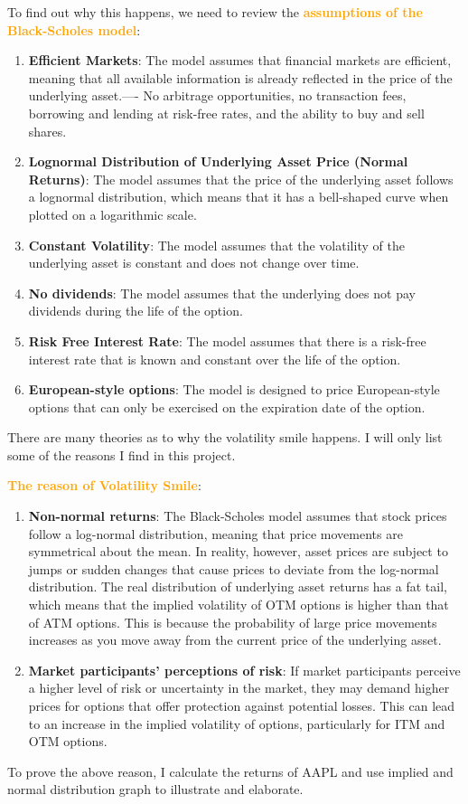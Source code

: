 \documentclass[11pt,en]{elegantpaper}
\begin{document}
To find out why this happens, we need to review the \textcolor{orange}{\textbf{assumptions of the Black-Scholes model}}:
\begin{enumerate}
    \item \textbf{Efficient Markets}: The model assumes that financial markets are efficient, meaning that all available information is already reflected in the price of the underlying asset.---- No arbitrage opportunities, no transaction fees, borrowing and lending at risk-free rates, and the ability to buy and sell shares.
    \item \textbf{Lognormal Distribution of Underlying Asset Price (Normal Returns)}: The model assumes that the price of the underlying asset follows a lognormal distribution, which means that it has a bell-shaped curve when plotted on a logarithmic scale.
    \item \textbf{Constant Volatility}: The model assumes that the volatility of the underlying asset is constant and does not change over time.
    \item \textbf{No dividends}: The model assumes that the underlying does not pay dividends during the life of the option.
    \item \textbf{Risk Free Interest Rate}: The model assumes that there is a risk-free interest rate that is known and constant over the life of the option.
    \item \textbf{European-style options}: The model is designed to price European-style options that can only be exercised on the expiration date of the option.
\end{enumerate}

There are many theories as to why the volatility smile happens. I will only list some of the reasons I find in this project.

\textcolor{orange}{\textbf{The reason of Volatility Smile}}:
\begin{enumerate}
    \item \textbf{Non-normal returns}:  The Black-Scholes model assumes that stock prices follow a log-normal distribution, meaning that price movements are symmetrical about the mean. In reality, however, asset prices are subject to jumps or sudden changes that cause prices to deviate from the log-normal distribution. The real distribution of underlying asset returns has a fat tail, which means that the implied volatility of OTM options is higher than that of ATM options. This is because the probability of large price movements increases as you move away from the current price of the underlying asset.
    \item \textbf{Market participants' perceptions of risk}: If market participants perceive a higher level of risk or uncertainty in the market, they may demand higher prices for options that offer protection against potential losses. This can lead to an increase in the implied volatility of options, particularly for ITM and OTM options.
\end{enumerate}
To prove the above reason, I calculate the returns of AAPL and use implied and normal distribution graph to illustrate and elaborate.
\end{document}
